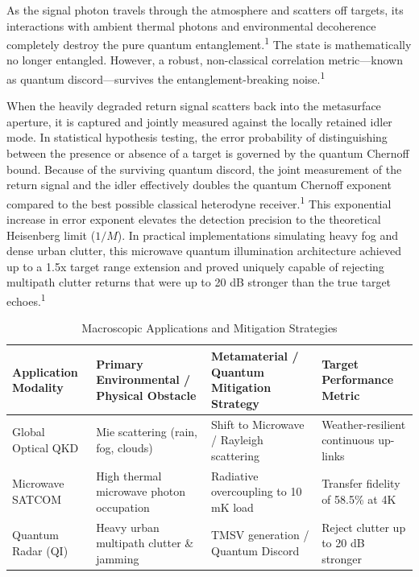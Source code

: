 \documentclass[11pt, a4paper]{article}
\begin{document}
As the signal photon travels through the atmosphere and scatters off targets, its interactions with ambient thermal photons and environmental decoherence completely destroy the pure quantum entanglement.\textsuperscript{1} The state is mathematically no longer entangled. However, a robust, non-classical correlation metric---known as quantum discord---survives the entanglement-breaking noise.\textsuperscript{1}

When the heavily degraded return signal scatters back into the metasurface aperture, it is captured and jointly measured against the locally retained idler mode. In statistical hypothesis testing, the error probability of distinguishing between the presence or absence of a target is governed by the quantum Chernoff bound. Because of the surviving quantum discord, the joint measurement of the return signal and the idler effectively doubles the quantum Chernoff exponent compared to the best possible classical heterodyne receiver.\textsuperscript{1} This exponential increase in error exponent elevates the detection precision to the theoretical Heisenberg limit ($1/M$). In practical implementations simulating heavy fog and dense urban clutter, this microwave quantum illumination architecture achieved up to a 1.5x target range extension and proved uniquely capable of rejecting multipath clutter returns that were up to 20 dB stronger than the true target echoes.\textsuperscript{1}

\begin{table}[h]
\centering
\renewcommand{\arraystretch}{1.3}
\begin{tabular}{p{} p{} p{} p{}}
\toprule
\textbf{Application Modality} & \textbf{Primary Environmental / Physical Obstacle} & \textbf{Metamaterial / Quantum Mitigation Strategy} & \textbf{Target Performance Metric} \\
\midrule
Global Optical QKD & Mie scattering (rain, fog, clouds) & Shift to Microwave / Rayleigh scattering & Weather-resilient continuous up-links \\
Microwave SATCOM & High thermal microwave photon occupation & Radiative overcoupling to 10 mK load & Transfer fidelity of 58.5\% at 4K \\
Quantum Radar (QI) & Heavy urban multipath clutter \& jamming & TMSV generation / Quantum Discord & Reject clutter up to 20 dB stronger \\
\bottomrule
\end{tabular}
\caption{Macroscopic Applications and Mitigation Strategies}
\end{table}
\end{document}
